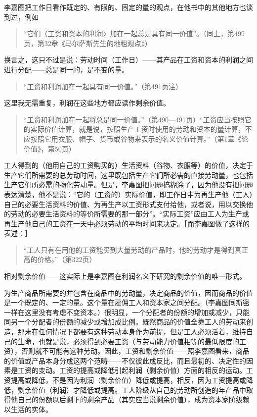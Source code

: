 李嘉图把工作日看作既定的、有限的、固定的量的观点，在他书中的其他地方也谈到过，例如

\begin{quote}{“它们〈工资和资本的利润〉加在一起总是具有同一价值”。（同上，第499页，第32章《马尔萨斯先生的地租观点》）}\end{quote}

换言之，这只不过是说：劳动时间（工作日）——其产品在工资和资本的利润之间进行分配——总是同一的，是不变的量。

\begin{quote}{“工资和利润加在一起具有同一价值。”（第491页注）}\end{quote}

这里我无需重复，利润在这些地方都应读作剩余价值。

\begin{quote}{“工资和利润加在一起将总是同一价值。”（第490—491页）“工资应当按照它的实际价值计算，就是说，按照生产工资时使用的劳动和资本的量计算，不应按照它用衣服、帽子、货币或谷物来表示的名义价值计算。”（第1章《论价值》，第50页）}\end{quote}

工人得到的（他用自己的工资购买的）生活资料（谷物、衣服等）的价值，决定于生产它们所需要的总劳动时间，这里既包括生产它们所必需的直接劳动量，也包括生产它们所必需的物化劳动量。但是，李嘉图把问题搞糊涂了，因为他没有把问题表达清楚，他不是说：“它的（工资的）实际价值，即工作日中为再生产他（工人）自己的必要生活资料的价值、为再生产以工资形式支付给他，或者说，用以交换他的劳动的必要生活资料的等价所需要的那一部分”。“实际工资”应由工人为生产或再生产他自己的工资在一天中必须劳动的平均时间来决定。［而李嘉图做了这样的表述：］

\begin{quote}{“工人只有在用他的工资能买到大量劳动的产品时，他的劳动才是得到真正高的价格。”（第322页）}\end{quote}


相对剩余价值——这实际上是李嘉图在利润名义下研究的剩余价值的唯一形式。

为生产商品所需要的并包含在商品中的劳动量，决定商品的价值，因而商品的价值是一个既定的、一定的量。这个量在雇佣工人和资本家之间分配。（李嘉图同斯密一样在这里没有考虑不变资本。）很明显，一个分配者的份额的增加或减少，只能同另一个分配者的份额的减少或增加成比例。既然商品的价值全靠工人的劳动来创造，那末在任何情况下都要有这种劳动本身作为前提，但是工人必须活着，维持自己的生命，也就是说，必须得到必要工资（与劳动能力价值相等的最低限度的工资），否则就不可能有这种劳动。因此，工资和剩余价值——照李嘉图看来，商品的价值或产品本身分成这两个范畴——不仅彼此成反比，而且最初的、决定性的因素是工资的变动。工资的提高或降低引起利润（剩余价值）方面的相反的运动。工资提高或降低，不是因为利润（剩余价值）降低或提高，相反，因为工资提高或降低，剩余价值（利润）才降低或提高。工人阶级从自己的劳动所创造的年产品中取得他自己的份额以后剩下的剩余产品（其实应当说剩余价值），成为资本家阶级赖以生活的实体。

